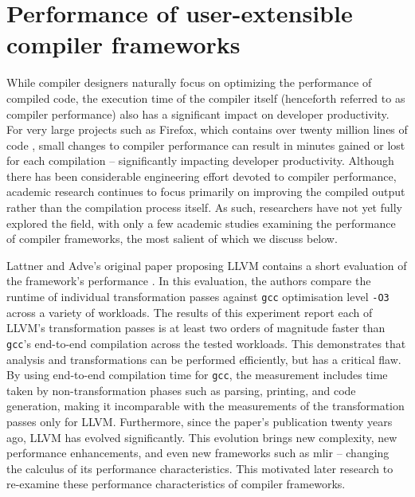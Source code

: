 \section{Performance of user-extensible compiler frameworks}
\label{sec:perf-user-extensible-frameworks}

While compiler designers naturally focus on optimizing the performance of compiled code, the execution time of the compiler itself (henceforth referred to as compiler performance) also has a significant impact on developer productivity.
For very large projects such as Firefox, which contains over twenty million lines of code \cite{bastienabadieEngineeringCodeQuality}, small changes to compiler performance can result in minutes gained or lost for each compilation -- significantly impacting developer productivity. Although there has been considerable engineering effort devoted to compiler performance, academic research continues to focus primarily on improving the compiled output rather than the compilation process itself.
As such, researchers have not yet fully explored the field, with only a few academic studies examining the performance of compiler frameworks, the most salient of which we discuss below.

Lattner and Adve's original paper proposing LLVM contains a short evaluation of the framework's performance \cite[Section 4.1.4]{lattnerLLVMCompilationFramework2004}.
In this evaluation, the authors compare the runtime of individual transformation passes against \texttt{gcc} optimisation level \texttt{-O3} across a variety of workloads.
The results of this experiment \cite[Table 2]{lattnerLLVMCompilationFramework2004} report each of LLVM's transformation passes is at least two orders of magnitude faster than \texttt{gcc}'s end-to-end compilation across the tested workloads. This demonstrates that analysis and transformations can be performed efficiently, but has a critical flaw. By using end-to-end compilation time for \texttt{gcc}, the measurement includes time taken by non-transformation phases such as parsing, printing, and code generation, making it incomparable with the measurements of the transformation passes only for LLVM.
Furthermore, since the paper's publication twenty years ago, LLVM has evolved significantly. This evolution brings new complexity, new performance enhancements, and even new frameworks such as \ac{mlir} -- changing the calculus of its performance characteristics.
This motivated later research to re-examine these performance characteristics of compiler frameworks.


